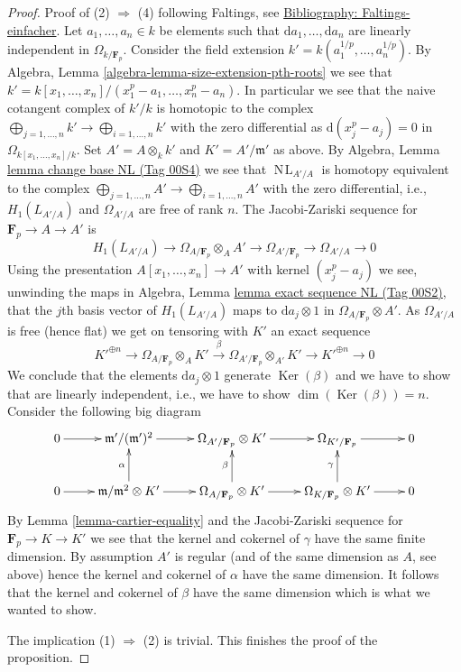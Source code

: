 \documentclass{amsart}
\theoremstyle{plain}
\theoremstyle{definition}
\theoremstyle{remark}
\numberwithin{equation}{subsection}
\def\NL{\mathop{N\!L}\nolimits}
\def\Ker{\mathop{\mathrm{Ker}}}
\begin{document}
\begin{proof}
\medskip\noindent
Proof of (2) $\Rightarrow$ (4) following Faltings, see
\href{https://stacks.math.columbia.edu/bibliography}{Bibliography: Faltings-einfacher}. Let $a_1, \ldots, a_n \in k$ be elements
such that $\text{d}a_1, \ldots, \text{d}a_n$ are linearly independent
in $\Omega_{k/\mathbf{F}_p}$. Consider the field extension
$k' = k(a_1^{1/p}, \ldots, a_n^{1/p})$. By
Algebra, Lemma \ref{algebra-lemma-size-extension-pth-roots}
we see that $k' = k[x_1, \ldots, x_n]/(x_1^p - a_1, \ldots, x_n^p - a_n)$.
In particular we see that the naive cotangent complex of $k'/k$
is homotopic to the complex
$\bigoplus_{j = 1, \ldots, n} k' \rightarrow \bigoplus_{i = 1, \ldots, n} k'$
with the zero differential as
$\text{d}(x_j^p - a_j) = 0$ in $\Omega_{k[x_1, \ldots, x_n]/k}$.
Set $A' = A \otimes_k k'$ and $K' = A'/\mathfrak m'$ as above.
By Algebra, Lemma \href{https://stacks.math.columbia.edu/tag/00S4}{lemma change base NL (Tag 00S4)}
we see that $\NL_{A'/A}$ is homotopy equivalent to the complex
$\bigoplus_{j = 1, \ldots, n} A' \rightarrow \bigoplus_{i = 1, \ldots, n} A'$
with the zero differential, i.e., $H_1(L_{A'/A})$ and
$\Omega_{A'/A}$ are free of rank $n$. The Jacobi-Zariski sequence for
$\mathbf{F}_p \to A \to A'$ is
$$
H_1(L_{A'/A}) \to \Omega_{A/\mathbf{F}_p} \otimes_A A'
\to \Omega_{A'/\mathbf{F}_p} \to \Omega_{A'/A} \to 0
$$
Using the presentation $A[x_1, \ldots, x_n] \to A'$ with
kernel $(x_j^p - a_j)$ we see, unwinding the maps in
Algebra, Lemma \href{https://stacks.math.columbia.edu/tag/00S2}{lemma exact sequence NL (Tag 00S2)},
that the $j$th basis vector of $H_1(L_{A'/A})$ maps to
$\text{d}a_j \otimes 1$ in $\Omega_{A/\mathbf{F}_p} \otimes A'$.
As $\Omega_{A'/A}$ is free (hence flat) we get on tensoring with $K'$
an exact sequence
$$
K'^{\oplus n} \to \Omega_{A/\mathbf{F}_p} \otimes_A K'
\xrightarrow{\beta} \Omega_{A'/\mathbf{F}_p} \otimes_{A'} K' \to
K'^{\oplus n} \to 0
$$
We conclude that the elements $\text{d}a_j \otimes 1$ generate
$\Ker(\beta)$ and we have to show that are linearly independent, i.e.,
we have to show $\dim(\Ker(\beta)) = n$.
Consider the following big diagram
$$
\xymatrix{
0 \ar[r] &
\mathfrak m'/(\mathfrak m')^2 \ar[r] &
\Omega_{A'/\mathbf{F}_p} \otimes K' \ar[r] &
\Omega_{K'/\mathbf{F}_p} \ar[r] & 0 \\
0 \ar[r] &
\mathfrak m/\mathfrak m^2 \otimes K' \ar[r] \ar[u]^\alpha &
\Omega_{A/\mathbf{F}_p} \otimes K' \ar[r] \ar[u]^\beta &
\Omega_{K/\mathbf{F}_p} \otimes K' \ar[r] \ar[u]^\gamma & 0
}
$$
By Lemma \ref{lemma-cartier-equality} and the Jacobi-Zariski sequence for
$\mathbf{F}_p \to K \to K'$ we see that the kernel and cokernel of
$\gamma$ have the same finite dimension.
By assumption $A'$ is regular (and of the same dimension as $A$, see
above) hence the kernel and cokernel of $\alpha$ have the same dimension.
It follows that the kernel and cokernel of $\beta$ have the same
dimension which is what we wanted to show.

\medskip\noindent
The implication (1) $\Rightarrow$ (2) is trivial. This finishes
the proof of the proposition.
\end{proof}
\end{document}
